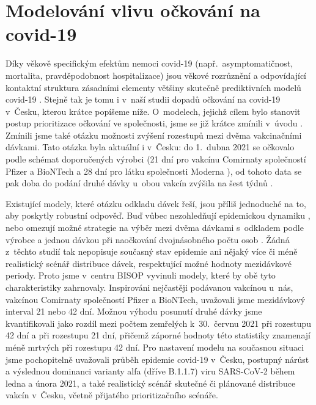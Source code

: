 \section*{Modelování vlivu očkování na covid-19}

Díky věkově specifickým efektům nemoci covid-19 (např.\ asymptomatičnost, mortalita, pravděpodobnost hospitalizace) jsou věkové rozrůznění a odpovídající kontaktní struktura zásadními elementy většiny skutečně prediktivních modelů covid-19 \cite[a mnoho dalších]{Davies_etal2020,Bubar_etal2021,Moore_etal2021,Rozhnova_etal2021}. Stejně tak je tomu i v~naší studii dopadů očkování na covid-19 v~Česku, kterou krátce popíšeme níže. O~modelech, jejichž cílem bylo stanovit postup prioritizace očkování ve společnosti, jsme se již krátce zmínili v~úvodu \cite{Bubar_etal2021,Moore_etal2021b}. Zmínili jsme také otázku možnosti zvýšení rozestupů mezi dvěma vakcinačními dávkami. Tato otázka byla aktuální i v~Česku: do 1.\ dubna 2021 se očkovalo podle schémat doporučených výrobci (21 dní pro vakcínu Comirnaty společností Pfizer a BioNTech a 28 dní pro látku společnosti Moderna \cite{original_delay}), od tohoto data se pak doba do podání druhé dávky u~obou vakcín zvýšila na šest týdnů \cite{covidportalspec}.

Existující modely, které otázku odkladu dávek řeší, jsou příliš jednoduché na to, aby poskytly robustní odpověď. Buď vůbec nezohledňují epidemickou dynamiku \cite{Tuite_etal2021}, nebo omezují možné strategie na výběr mezi dvěma dávkami s~odkladem podle výrobce a jednou dávkou při naočkování dvojnásobného počtu osob \cite{Paltiel_etal2021}. Žádná z~těchto studií tak nepopisuje současný stav epidemie ani nějaký více či méně realistický scénář distribuce dávek, respektující možné hodnoty mezidávkové periody. Proto jsme v~centru BISOP vyvinuli modely, které by obě tyto charakteristiky zahrnovaly. Inspirováni nejčastěji podávanou vakcínou u~nás, vakcínou Comirnaty společností Pfizer a BioNTech, uvažovali jsme mezidávkový interval 21 nebo 42 dní. Možnou výhodu posunutí druhé dávky jsme kvantifikovali jako rozdíl mezi počtem zemřelých k~30.\ červnu 2021 při rozestupu 42 dní a při rozestupu 21 dní, přičemž záporné hodnoty této statistiky znamenají méně mrtvých při rozestupu 42 dní. Pro nastavení modelu na současnou situaci jsme pochopitelně uvažovali průběh epidemie covid-19 v~Česku, postupný nárůst a výslednou dominanci varianty alfa (dříve B.1.1.7) viru SARS-CoV-2 během ledna a února 2021, a také realistický scénář skutečné či plánované distribuce vakcín v~Česku, včetně přijatého prioritizačního scénáře. 

